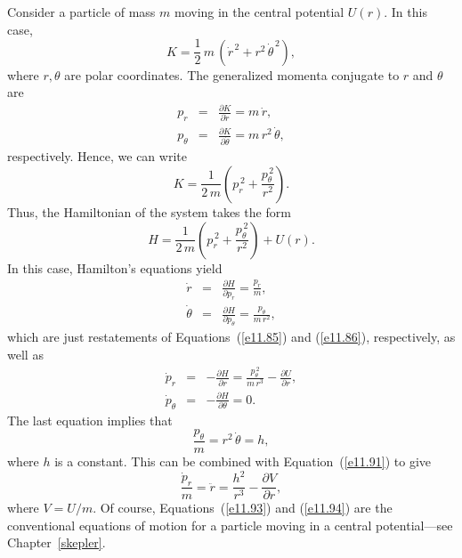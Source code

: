 Consider a particle of mass $m$ moving in the central potential $U(r)$. 
In this case,
\begin{equation}
K = \frac{1}{2}\,m\,(\dot{r}^{\,2} + r^2\,\dot{\theta}^{\,2}),
\end{equation}
where $r,\theta$ are  polar coordinates. The generalized momenta conjugate to $r$ and $\theta$ are
\begin{eqnarray}\label{e11.85}
p_r &=& \frac{\partial K}{\partial \dot{r}} = m\,\dot{r},\\[0.5ex]
p_\theta &=& \frac{\partial K}{\partial \dot{\theta}} = m\,r^2\,\dot{\theta},\label{e11.86}
\end{eqnarray}
respectively.
Hence, we can write
\begin{equation}
K = \frac{1}{2\,m}\left(p_r^{\,2} + \frac{p_\theta^{\,2}}{r^2}\right).
\end{equation}
Thus, the Hamiltonian of the system takes the form
\begin{equation}
H = \frac{1}{2\,m}\left(p_r^{\,2} + \frac{p_\theta^{\,2}}{r^2}\right)
+ U(r).
\end{equation}
In this case, Hamilton's equations yield
\begin{eqnarray}
\dot{r} &=& \frac{\partial H}{\partial p_r} = \frac{p_r}{m},\\[0.5ex]
\dot{\theta}&=& \frac{\partial H}{\partial p_\theta} = \frac{p_\theta}{m\,r^2},
\end{eqnarray}
which are just restatements of Equations~(\ref{e11.85}) and (\ref{e11.86}), respectively, 
as well as
\begin{eqnarray}\label{e11.91}
\dot{p}_r &=& -\frac{\partial H}{\partial r} = \frac{p_\theta^{\,2}}{m\,r^3}-\frac{\partial U}{\partial r},\\[0.5ex]
\dot{p}_\theta &=& -\frac{\partial H}{\partial \theta} = 0.
\end{eqnarray}
The last equation implies that
\begin{equation}\label{e11.93}
\frac{p_\theta}{m} =r^2\,\dot{\theta} =h,
\end{equation}
where $h$ is a constant. This can be combined with Equation~(\ref{e11.91})
to give
\begin{equation}\label{e11.94}
\frac{\dot{p}_r}{m} = \ddot{r} = \frac{h^2}{r^3} - \frac{\partial V}{\partial r},
\end{equation}
where $V=U/m$. Of course, Equations~(\ref{e11.93}) and (\ref{e11.94}) are the
conventional equations of motion for a particle moving in a central potential---see Chapter~\ref{skepler}.

